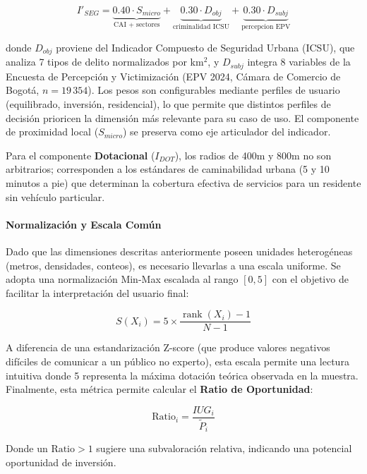 \documentclass[12pt, a4paper, twoside, openright]{report}
\theoremstyle{plain}
\theoremstyle{definition}
\newcommand{\IUG}{IUG}             %
\begin{document}
\begin{equation}\label{eq:iseg_tridim}
I'_{SEG} = \underbrace{0.40 \cdot S_{micro}}_{\text{CAI + sectores}}
+ \underbrace{0.30 \cdot D_{obj}}_{\text{criminalidad ICSU}}
+ \underbrace{0.30 \cdot D_{subj}}_{\text{percepcion EPV}}
\end{equation}

donde $D_{obj}$ proviene del Indicador Compuesto de Seguridad Urbana (ICSU), que analiza 7 tipos de delito normalizados por km$^2$, y $D_{subj}$ integra 8 variables de la Encuesta de Percepción y Victimización (EPV 2024, Cámara de Comercio de Bogotá, $n = 19\,354$). Los pesos son configurables mediante perfiles de usuario (equilibrado, inversión, residencial), lo que permite que distintos perfiles de decisión prioricen la dimensión más relevante para su caso de uso. El componente de proximidad local ($S_{micro}$) se preserva como eje articulador del indicador.

Para el componente \textbf{Dotacional} ($I_{DOT}$), los radios de 400m y 800m no son arbitrarios; corresponden a los estándares de caminabilidad urbana (5 y 10 minutos a pie) que determinan la cobertura efectiva de servicios para un residente sin vehículo particular.

\paragraph{Normalización y Escala Común}
Dado que las dimensiones descritas anteriormente poseen unidades heterogéneas (metros, densidades, conteos), es necesario llevarlas a una escala uniforme. Se adopta una normalización Min-Max escalada al rango $[0, 5]$ con el objetivo de facilitar la interpretación del usuario final:

\begin{equation}
S(X_i) = 5 \times \frac{\operatorname{rank}(X_i)-1}{N-1}
\end{equation}

A diferencia de una estandarización Z-score (que produce valores negativos difíciles de comunicar a un público no experto), esta escala permite una lectura intuitiva donde 5 representa la máxima dotación teórica observada en la muestra. Finalmente, esta métrica permite calcular el \textbf{Ratio de Oportunidad}:

\begin{equation}
\text{Ratio}_i = \frac{\IUG_i}{\tilde P_i}
\end{equation}

Donde un $\text{Ratio} > 1$ sugiere una subvaloración relativa, indicando una potencial oportunidad de inversión.
\end{document}
